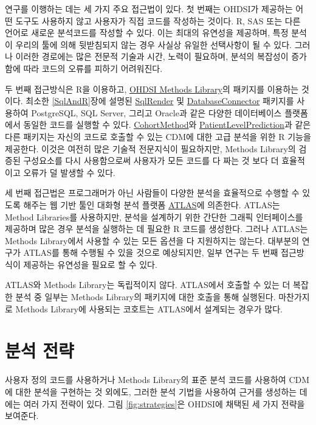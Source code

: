 \documentclass[11pt]{book}
\theoremstyle{definition}
\theoremstyle{definition}
\theoremstyle{definition}
\theoremstyle{remark}
\begin{document}
연구를 이행하는 데는 세 가지 주요 접근법이 있다. 첫 번째는 OHDSI가
제공하는 어떤 도구도 사용하지 않고 사용자가 직접 코드를 작성하는 것이다.
R, SAS 또는 다른 언어로 새로운 분석코드를 작성할 수 있다. 이는 최대의
유연성을 제공하며, 특정 분석이 우리의 툴에 의해 뒷받침되지 않는 경우
사실상 유일한 선택사항이 될 수 있다. 그러나 이러한 경로에는 많은 전문적
기술과 시간, 노력이 필요하며, 분석의 복잡성이 증가함에 따라 코드의
오류를 피하기 어려워진다.

두 번째 접근방식은 R을 이용하고,
\href{https://ohdsi.github.io/MethodsLibrary/}{OHDSI Methods Library}의
패키지를 이용하는 것이다. 최소한 \ref{SqlAndR}장에 설명된
\href{https://ohdsi.github.io/SqlRender/}{SqlRender} 및
\href{https://ohdsi.github.io/DatabaseConnector/}{DatabaseConnector}
패키지를 사용하여 PostgreSQL, SQL Server, 그리고 Oracle과 같은 다양한
데이터베이스 플랫폼에서 동일한 코드를 실행할 수 있다.
\href{https://ohdsi.github.io/CohortMethod/}{CohortMethod}와
\href{https://ohdsi.github.io/PatientLevelPrediction/}{PatientLevelPrediction}과
같은 다른 패키지는 자신의 코드로 호출할 수 있는 CDM에 대한 고급 분석을
위한 R 기능을 제공한다. 이것은 여전히 많은 기술적 전문지식이 필요하지만,
Methods Library의 검증된 구성요소를 다시 사용함으로써 사용자가 모든
코드를 다 짜는 것 보다 더 효율적이고 오류가 덜 발생할 수 있다.

세 번째 접근법은 프로그래머가 아닌 사람들이 다양한 분석을 효율적으로
수행할 수 있도록 해주는 웹 기반 툴인 대화형 분석 플랫폼
\href{https://github.com/OHDSI/Atlas/wiki}{ATLAS}에 의존한다. ATLAS는
Method Libraries를 사용하지만, 분석을 설계하기 위한 간단한 그래픽
인터페이스를 제공하며 많은 경우 분석을 실행하는 데 필요한 R 코드를
생성한다. 그러나 ATLAS는 Methods Library에서 사용할 수 있는 모든 옵션을
다 지원하지는 않는다. 대부분의 연구가 ATLAS를 통해 수행될 수 있을 것으로
예상되지만, 일부 연구는 두 번째 접근방식이 제공하는 유연성을 필요로 할
수 있다.

ATLAS와 Methods Library는 독립적이지 않다. ATLAS에서 호출할 수 있는 더
복잡한 분석 중 일부는 Methods Library의 패키지에 대한 호출을 통해
실행된다. 마찬가지로 Methods Library에 사용되는 코호트는 ATLAS에서
설계되는 경우가 많다.

\section{분석 전략}\label{-}

사용자 정의 코드를 사용하거나 Methods Library의 표준 분석 코드를
사용하여 CDM에 대한 분석을 구현하는 것 외에도, 그러한 분석 기법을
사용하여 근거를 생성하는 데에는 여러 가지 전략이 있다. 그림
\ref{fig:strategies}은 OHDSI에 채택된 세 가지 전략을 보여준다.
\end{document}
